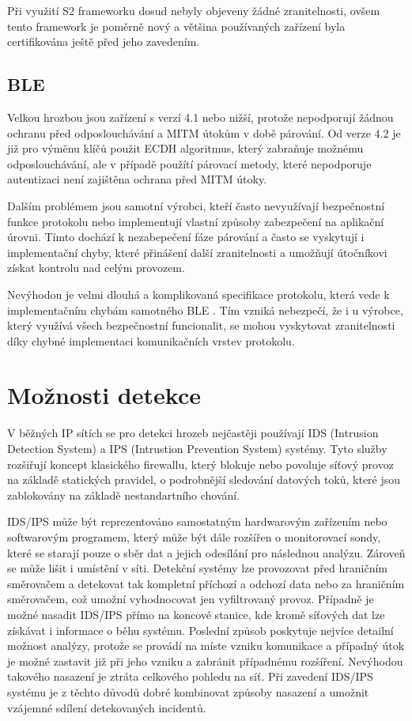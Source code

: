  Při využití S2 frameworku dosud nebyly objeveny žádné zranitelnosti, ovšem tento
 framework je poměrně nový a většina používaných zařízení byla certifikována 
 ještě před jeho zavedením.
 
 \subsection{BLE}
 Velkou hrozbou jsou zařízení s verzí 4.1 nebo nižší, protože nepodporují žádnou ochranu před 
 odposlouchávání a MITM útokům v době párování. Od verze 4.2 je již pro výměnu klíčů použit ECDH 
 algoritmus, který zabraňuje možnému odposlouchávání, ale v případě použítí párovací metody, které
 nepodporuje autentizaci není zajištěna ochrana před MITM útoky.  \cite{cesnet-survey}
 
 Dalším problémem jsou samotní výrobci, kteří často nevyužívají bezpečnostní funkce protokolu  \cite{ble-locks} nebo
 implementují vlastní způsoby zabezpečení na aplikační úrovni. Tímto dochází k nezabepečení fáze 
 párování a často se vyskytují i implementační chyby, které přinášení další zranitelnosti \cite{ble-attack} a
 umožňují útočníkovi získat kontrolu nad celým provozem.  \cite{cesnet-survey}
 
 Nevýhodou je velmi dlouhá a komplikovaná specifikace protokolu, která vede k implementačním 
 chybám samotného BLE \cite{blueborne}. Tím vzniká nebezpečí, že i u výrobce, který využívá
 všech bezpečnostní funcionalit,
 se mohou vyskytovat zranitelnosti díky chybné implementaci komunikačních vrstev protokolu. \cite{cesnet-survey}
 
 \newpage
 \section{Možnosti detekce}
 V běžných IP sítích se pro detekci hrozeb nejčastěji používají IDS (Intrusion Detection System) a
 IPS (Intrustion Prevention System) systémy. Tyto služby rozšiřují koncept klasického firewallu, který
 blokuje nebo povoluje síťový provoz na základě statických pravidel, o podrobnější sledování 
 datových toků, které jsou zablokovány na základě nestandartního chování.
 
 IDS/IPS může být reprezentováno samostatným hardwarovým zařízením nebo softwarovým programem, který
 může být dále rozšířen o monitorovací sondy, které se starají pouze o sběr dat a jejich odesílání
 pro následnou analýzu. Zároveň
 se může lišit i umístění v síti. Detekční systémy lze provozovat před hraničním směrovačem 
 a detekovat tak kompletní příchozí a odchozí data nebo za hraničním směrovačem, což 
 umožní vyhodnocovat jen vyfiltrovaný provoz. Případně je možné nasadit IDS/IPS přímo na koncové
 stanice, kde kromě síťových dat lze získávat i informace o běhu systému. Poslední způsob poskytuje
 nejvíce detailní možnost analýzy, protože se provádí na míste vzniku komunikace a případný útok
 je možné zastavit již při jeho vzniku a zabránit případnému rozšíření. Nevýhodou takového nasazení
 je ztráta celkového pohledu na síť. Při zavedení IDS/IPS systému je z těchto důvodů dobré 
 kombinovat způsoby nasazení a umožnit vzájemné sdílení detekovaných incidentů.
 
